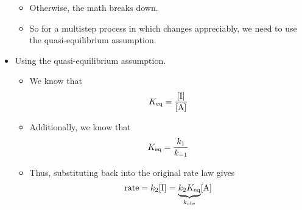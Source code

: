 \documentclass[../notes.tex]{subfiles}
\begin{document}
\begin{itemize}
\begin{itemize}
        \item Otherwise, the math breaks down.
        \item So for a multistep process in which  changes appreciably, we need to use the quasi-equilibrium assumption.
    \end{itemize}
    \item Using the quasi-equilibrium assumption.
    \begin{itemize}
        \item We know that
        \begin{equation*}
            \Keq = \frac{\cnc{I}}{\cnc{A}}
        \end{equation*}
        \item Additionally, we know that
        \begin{equation*}
            K_\textup{eq} = \frac{k_1}{k_{-1}}
        \end{equation*}
        \item Thus, substituting back into the original rate law gives
        \begin{equation*}
            \rate = k_2\cnc{I}
            = \underbrace{k_2\Keq}_{\kobs}\cnc{A}
        \end{equation*}
    \end{itemize}
\end{itemize}
\end{document}
